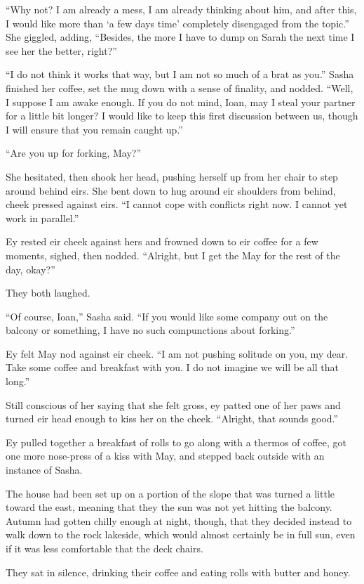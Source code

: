 ``Why not? I am already a mess, I am already thinking about him, and after this, I would like more than `a few days time' completely disengaged from the topic.'' She giggled, adding, ``Besides, the more I have to dump on Sarah the next time I see her the better, right?''

``I do not think it works that way, but I am not so much of a brat as you.'' Sasha finished her coffee, set the mug down with a sense of finality, and nodded. ``Well, I suppose I am awake enough. If you do not mind, Ioan, may I steal your partner for a little bit longer? I would like to keep this first discussion between us, though I will ensure that you remain caught up.''

``Are you up for forking, May?''

She hesitated, then shook her head, pushing herself up from her chair to step around behind eirs. She bent down to hug around eir shoulders from behind, cheek pressed against eirs. ``I cannot cope with conflicts right now. I cannot yet work in parallel.''

Ey rested eir cheek against hers and frowned down to eir coffee for a few moments, sighed, then nodded. ``Alright, but I get the May for the rest of the day, okay?''

They both laughed.

``Of course, Ioan,'' Sasha said. ``If you would like some company out on the balcony or something, I have no such compunctions about forking.''

Ey felt May nod against eir cheek. ``I am not pushing solitude on you, my dear. Take some coffee and breakfast with you. I do not imagine we will be all that long.''

Still conscious of her saying that she felt gross, ey patted one of her paws and turned eir head enough to kiss her on the cheek. ``Alright, that sounds good.''

Ey pulled together a breakfast of rolls to go along with a thermos of coffee, got one more nose-press of a kiss with May, and stepped back outside with an instance of Sasha.

The house had been set up on a portion of the slope that was turned a little toward the east, meaning that they the sun was not yet hitting the balcony. Autumn had gotten chilly enough at night, though, that they decided instead to walk down to the rock lakeside, which would almost certainly be in full sun, even if it was less comfortable that the deck chairs.

They sat in silence, drinking their coffee and eating rolls with butter and honey.

